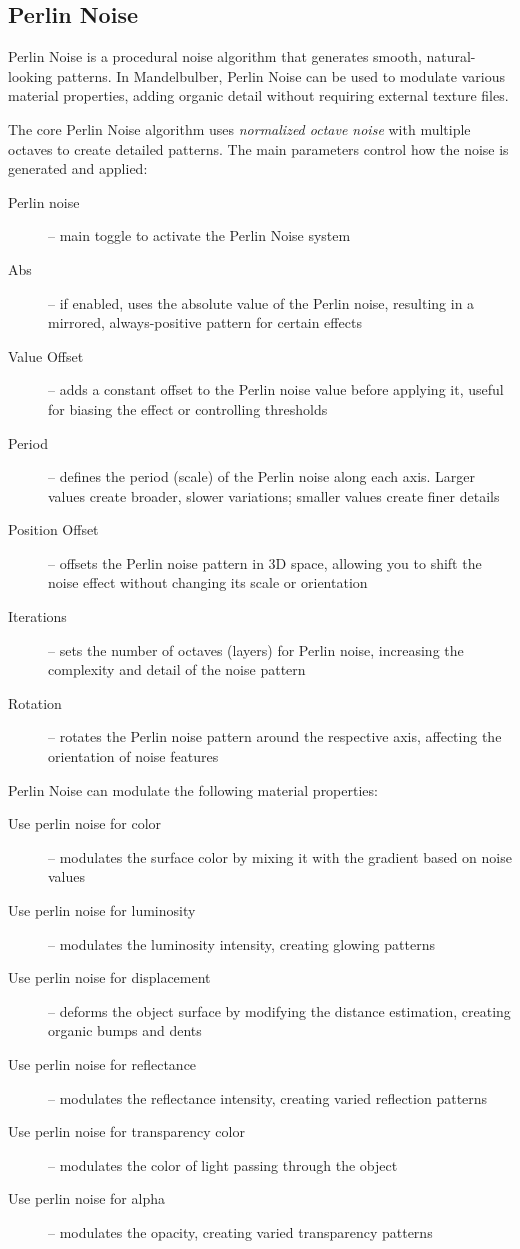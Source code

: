 \subsection{Perlin Noise}\label{materials-perlin-noise}

Perlin Noise is a procedural noise algorithm that generates smooth, natural-looking patterns. In Mandelbulber, Perlin Noise can be used to modulate various material properties, adding organic detail without requiring external texture files.

The core Perlin Noise algorithm uses \emph{normalized octave noise} with multiple octaves to create detailed patterns. The main parameters control how the noise is generated and applied:

\begin{description}
	\item[Perlin noise] -- main toggle to activate the Perlin Noise system
	\item[Abs] -- if enabled, uses the absolute value of the Perlin noise, resulting in a mirrored, always-positive pattern for certain effects
	\item[Value Offset] -- adds a constant offset to the Perlin noise value before applying it, useful for biasing the effect or controlling thresholds
	\item[Period] -- defines the period (scale) of the Perlin noise along each axis. Larger values create broader, slower variations; smaller values create finer details
	\item[Position Offset] -- offsets the Perlin noise pattern in 3D space, allowing you to shift the noise effect without changing its scale or orientation
	\item[Iterations] -- sets the number of octaves (layers) for Perlin noise, increasing the complexity and detail of the noise pattern
	\item[Rotation] -- rotates the Perlin noise pattern around the respective axis, affecting the orientation of noise features
\end{description}

Perlin Noise can modulate the following material properties:

\begin{description}
	\item[Use perlin noise for color] -- modulates the surface color by mixing it with the gradient based on noise values
	\item[Use perlin noise for luminosity] -- modulates the luminosity intensity, creating glowing patterns
	\item[Use perlin noise for displacement] -- deforms the object surface by modifying the distance estimation, creating organic bumps and dents
	\item[Use perlin noise for reflectance] -- modulates the reflectance intensity, creating varied reflection patterns
	\item[Use perlin noise for transparency color] -- modulates the color of light passing through the object
	\item[Use perlin noise for alpha] -- modulates the opacity, creating varied transparency patterns
\end{description}

